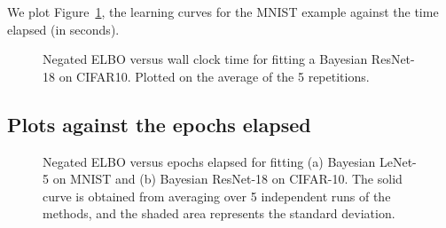 \documentclass{article}
\begin{document}
We plot Figure~\ref{fig:resnetopt_wallclock}, the learning curves for the MNIST example against the time elapsed (in seconds).
\begin{figure}[H]
    \centering
  \caption{Negated ELBO versus wall clock time for fitting a Bayesian ResNet-18 on CIFAR10. Plotted on the average of the 5 repetitions.}\label{fig:resnetopt_wallclock}
\end{figure}



\subsection{Plots against the epochs elapsed}

\begin{figure}[H]
    \centering
  \caption{Negated ELBO versus epochs elapsed for fitting (a) Bayesian LeNet-5 on MNIST and (b) Bayesian ResNet-18 on CIFAR-10. The solid curve is obtained from averaging over 5 independent runs of the methods, and the shaded area represents the standard deviation.}\label{fig:lenetopt}
\end{figure}

\end{document}
